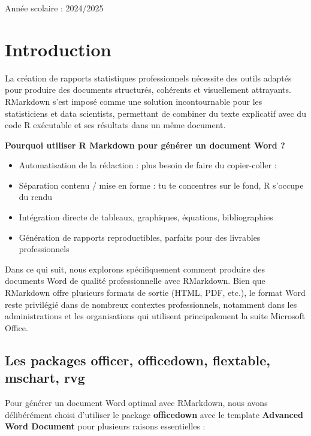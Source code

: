 \documentclass[
]{article}
\begin{document}
\begin{titlepage}
\begin{center}
        \vfill 

        {\large \textsf{Année scolaire : 2024/2025}}\\[0.5cm]
        
    \end{center}
\end{titlepage}

\section{Introduction}\label{introduction}

La création de rapports statistiques professionnels nécessite des outils
adaptés pour produire des documents structurés, cohérents et
visuellement attrayants. RMarkdown s'est imposé comme une solution
incontournable pour les statisticiens et data scientists, permettant de
combiner du texte explicatif avec du code R exécutable et ses résultats
dans un même document.

\textbf{Pourquoi utiliser R Markdown pour générer un document Word ?}

\begin{itemize}
\item
  Automatisation de la rédaction : plus besoin de faire du copier-coller
  :
\item
  Séparation contenu / mise en forme : tu te concentres sur le fond, R
  s'occupe du rendu
\item
  Intégration directe de tableaux, graphiques, équations, bibliographies
\item
  Génération de rapports reproductibles, parfaits pour des livrables
  professionnels
\end{itemize}

Dans ce qui suit, nous explorons spécifiquement comment produire des
documents Word de qualité professionnelle avec RMarkdown. Bien que
RMarkdown offre plusieurs formats de sortie (HTML, PDF, etc.), le format
Word reste privilégié dans de nombreux contextes professionnels,
notamment dans les administrations et les organisations qui utilisent
principalement la suite Microsoft Office.

\subsection{Les packages officer, officedown, flextable, mschart,
rvg}\label{les-packages-officer-officedown-flextable-mschart-rvg}

Pour générer un document Word optimal avec RMarkdown, nous avons
délibérément choisi d'utiliser le package \textbf{officedown} avec le
template \textbf{Advanced Word Document} pour plusieurs raisons
essentielles :
\end{document}
